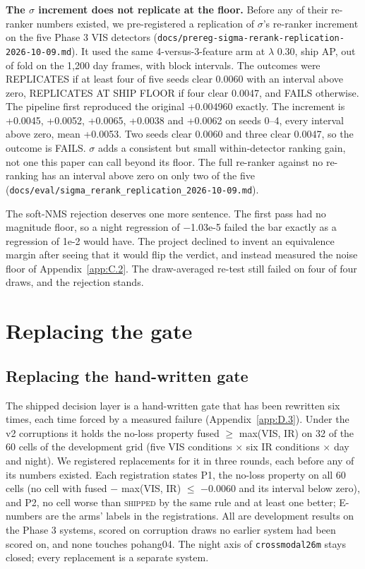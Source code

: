 \documentclass[10pt]{article}
\begin{document}
\textbf{The $\sigma$ increment does not replicate at the floor.} Before any of their re-ranker numbers existed, we pre-registered a replication of $\sigma$'s re-ranker increment on the five Phase 3 VIS detectors (\texttt{docs/\allowbreak{}prereg-sigma-rerank-replication-2026-10-09.md}). It used the same 4-versus-3-feature arm at $\lambda$ 0.30, ship AP, out of fold on the 1,200 day frames, with block intervals. The outcomes were REPLICATES if at least four of five seeds clear 0.0060 with an interval above zero, REPLICATES AT SHIP FLOOR if four clear 0.0047, and FAILS otherwise. The pipeline first reproduced the original +0.004960 exactly. The increment is +0.0045, +0.0052, +0.0065, +0.0038 and +0.0062 on seeds 0--4, every interval above zero, mean +0.0053. Two seeds clear 0.0060 and three clear 0.0047, so the outcome is FAILS. $\sigma$ adds a consistent but small within-detector ranking gain, not one this paper can call beyond its floor. The full re-ranker against no re-ranking has an interval above zero on only two of the five (\texttt{docs/\allowbreak{}eval/\allowbreak{}sigma\_\allowbreak{}rerank\_\allowbreak{}replication\_\allowbreak{}2026-10-09.md}).

The soft-NMS rejection deserves one more sentence. The first pass had no magnitude floor, so a night regression of $-$1.03e-5 failed the bar exactly as a regression of 1e-2 would have. The project declined to invent an equivalence margin after seeing that it would flip the verdict, and instead measured the noise floor of Appendix~\ref{app:C.2}. The draw-averaged re-test still failed on four of four draws, and the rejection stands.

\FloatBarrier
\section{Replacing the gate}\label{app:F}
\subsection{Replacing the hand-written gate}\label{app:F.1}
The shipped decision layer is a hand-written gate that has been rewritten six times, each time forced by a measured failure (Appendix~\ref{app:D.3}). Under the v2 corruptions it holds the no-loss property fused $\geq$ max(VIS, IR) on 32 of the 60 cells of the development grid (five VIS conditions $\times$ six IR conditions $\times$ day and night). We registered replacements for it in three rounds, each before any of its numbers existed. Each registration states P1, the no-loss property on all 60 cells (no cell with fused $-$ max(VIS, IR) $\leq$ $-$0.0060 and its interval below zero), and P2, no cell worse than \textsc{shipped} by the same rule and at least one better; E-numbers are the arms' labels in the registrations. All are development results on the Phase 3 systems, scored on corruption draws no earlier system had been scored on, and none touches pohang04. The night axis of \texttt{crossmodal26m} stays closed; every replacement is a separate system.
\end{document}
